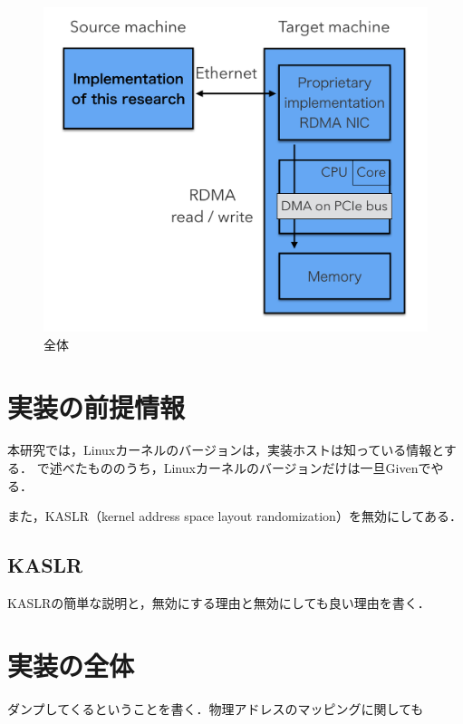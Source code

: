 \begin{figure}[htbp]
    \caption{全体}
    \label{fig:zentai}
    \begin{center}
        \includegraphics[bb=0 0 1000 800,width=15cm]{img/zentai.png}
    \end{center}
\end{figure}

\section{実装の前提情報}

本研究では，Linuxカーネルのバージョンは，実装ホストは知っている情報とする．
\label{section:want}で述べたもののうち，Linuxカーネルのバージョンだけは一旦Givenでやる．

また，KASLR（kernel address space layout randomization）を無効にしてある．

\subsection{KASLR}

KASLRの簡単な説明と，無効にする理由と無効にしても良い理由を書く．

\section{実装の全体}

ダンプしてくるということを書く．物理アドレスのマッピングに関しても

